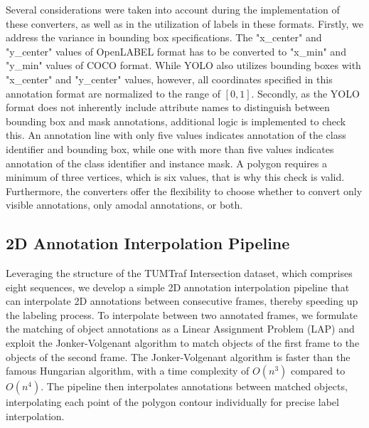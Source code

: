 Several considerations were taken into account during the implementation of these converters, as well as in the utilization of labels in these formats. Firstly, we address the variance in bounding box specifications. The "x\_center" and  "y\_center" values of OpenLABEL format has to be converted to "x\_min" and  "y\_min" values of COCO format. While YOLO also utilizes bounding boxes with "x\_center" and  "y\_center" values, however, all coordinates specified in this annotation format are normalized to the range of $[0,1]$. Secondly, as the YOLO format does not inherently include attribute names to distinguish between bounding box and mask annotations, additional logic is implemented to check this. An annotation line with only five values indicates annotation of the class identifier and bounding box, while one with more than five values indicates annotation of the class identifier and instance mask. A polygon requires a minimum of three vertices, which is six values, that is why this check is valid. Furthermore, the converters offer the flexibility to choose whether to convert only visible annotations, only amodal annotations, or both.

\subsection{2D Annotation Interpolation Pipeline}  \label{sec:2d_interpolation_pipeline}

Leveraging the structure of the TUMTraf Intersection dataset, which comprises eight sequences, we develop a simple 2D annotation interpolation pipeline that can interpolate 2D annotations between consecutive frames, thereby speeding up the labeling process. To interpolate between two annotated frames, we formulate the matching of object annotations as a Linear Assignment Problem (LAP) and exploit the Jonker-Volgenant algorithm to match objects of the first frame to the objects of the second frame. The Jonker-Volgenant algorithm \cite{Jonker_Volgenant} is faster than the famous Hungarian algorithm, with a time complexity of $O(n^3)$ compared to $O(n^4)$. The pipeline then interpolates annotations between matched objects, interpolating each point of the polygon contour individually for precise label interpolation.

